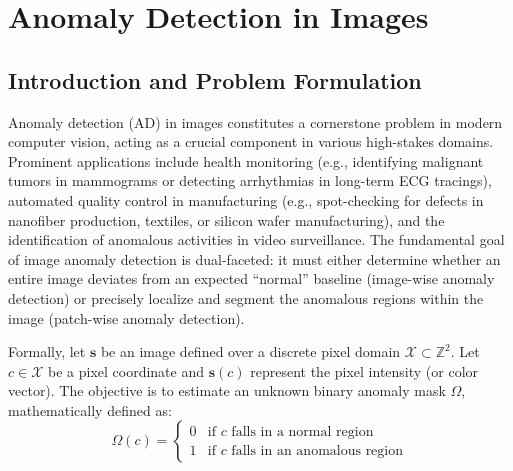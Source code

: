 \chapter{Anomaly Detection in Images}
\label{ch:anomaly_detection_images}

\section{Introduction and Problem Formulation}
Anomaly detection (AD) in images constitutes a cornerstone problem in modern computer vision, acting as a crucial component in various high-stakes domains. Prominent applications include health monitoring (e.g., identifying malignant tumors in mammograms or detecting arrhythmias in long-term ECG tracings), automated quality control in manufacturing (e.g., spot-checking for defects in nanofiber production, textiles, or silicon wafer manufacturing), and the identification of anomalous activities in video surveillance. The fundamental goal of image anomaly detection is dual-faceted: it must either determine whether an entire image deviates from an expected ``normal'' baseline (image-wise anomaly detection) or precisely localize and segment the anomalous regions within the image (patch-wise anomaly detection).

Formally, let $\boldsymbol{s}$ be an image defined over a discrete pixel domain $\mathcal{X} \subset \mathbb{Z}^2$. Let $c \in \mathcal{X}$ be a pixel coordinate and $\boldsymbol{s}(c)$ represent the pixel intensity (or color vector). The objective is to estimate an unknown binary anomaly mask $\Omega$, mathematically defined as:
\begin{equation}
    \Omega(c) = \begin{cases} 
    0 & \text{if } c \text{ falls in a normal region} \\
    1 & \text{if } c \text{ falls in an anomalous region}
    \end{cases}
\end{equation}

